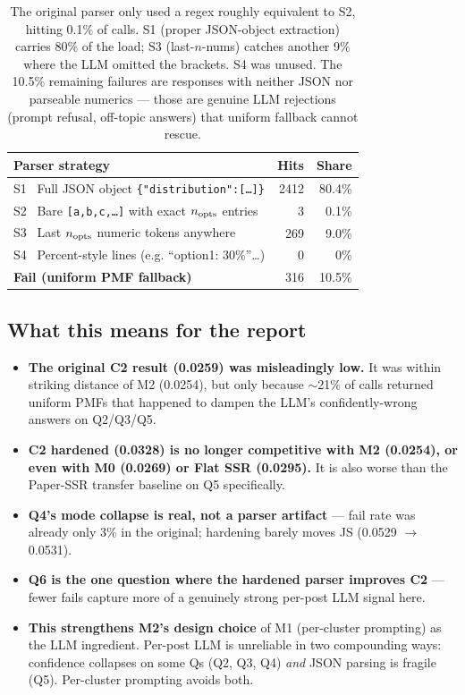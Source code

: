 \documentclass[10pt,a4paper]{article}
\begin{document}
\begin{table}[H]
\centering
\small
\begin{tabular}{l r r}
\toprule
\textbf{Parser strategy} & \textbf{Hits} & \textbf{Share} \\
\midrule
S1 \ Full JSON object \texttt{\{"distribution":[\ldots]\}} & 2412 & 80.4\% \\
S2 \ Bare \texttt{[a,b,c,\ldots]} with exact $n_{\rm opts}$ entries  & 3 & 0.1\% \\
S3 \ Last $n_{\rm opts}$ numeric tokens anywhere & 269 & 9.0\% \\
S4 \ Percent-style lines (e.g. ``option1: 30\%''\ldots) & 0 & 0\% \\
\midrule
\rowcolor{badrow}
\textbf{Fail (uniform PMF fallback)} & 316 & 10.5\% \\
\bottomrule
\end{tabular}
\caption{The original parser only used a regex roughly equivalent to S2, hitting 0.1\% of calls. S1 (proper JSON-object extraction) carries 80\% of the load; S3 (last-$n$-nums) catches another 9\% where the LLM omitted the brackets. S4 was unused. The 10.5\% remaining failures are responses with neither JSON nor parseable numerics — those are genuine LLM rejections (prompt refusal, off-topic answers) that uniform fallback cannot rescue.}
\end{table}

\subsection{What this means for the report}

\begin{itemize}[leftmargin=*,itemsep=1pt]
    \item \textbf{The original C2 result (0.0259) was misleadingly low.} It was within striking distance of M2 (0.0254), but only because $\sim$21\% of calls returned uniform PMFs that happened to dampen the LLM's confidently-wrong answers on Q2/Q3/Q5.
    \item \textbf{C2 hardened (0.0328) is no longer competitive with M2 (0.0254), or even with M0 (0.0269) or Flat SSR (0.0295).} It is also worse than the Paper-SSR transfer baseline on Q5 specifically.
    \item \textbf{Q4's mode collapse is real, not a parser artifact} — fail rate was already only 3\% in the original; hardening barely moves JS (0.0529 $\to$ 0.0531).
    \item \textbf{Q6 is the one question where the hardened parser improves C2} — fewer fails capture more of a genuinely strong per-post LLM signal here.
    \item \textbf{This strengthens M2's design choice} of M1 (per-cluster prompting) as the LLM ingredient. Per-post LLM is unreliable in two compounding ways: confidence collapses on some Qs (Q2, Q3, Q4) \emph{and} JSON parsing is fragile (Q5). Per-cluster prompting avoids both.
\end{itemize}
\end{document}
